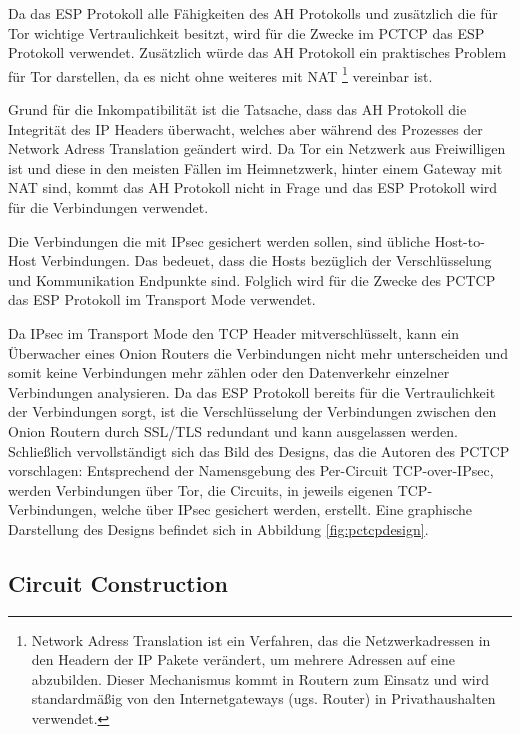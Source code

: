 \documentclass[fleqn,envcountsame,runningheads,10pt,a4paper]{llncs}
\begin{document}
Da das ESP Protokoll alle Fähigkeiten des AH Protokolls und zusätzlich die für 
Tor wichtige Vertraulichkeit besitzt, wird für die Zwecke im PCTCP das ESP 
Protokoll verwendet. Zusätzlich würde das AH Protokoll ein praktisches Problem 
für Tor darstellen, da es nicht ohne weiteres mit NAT \footnote{Network Adress 
Translation \cite{rfc:nat} ist ein Verfahren, das die Netzwerkadressen in den  
Headern der IP Pakete verändert, um mehrere Adressen auf eine abzubilden. Dieser 
Mechanismus kommt in Routern zum Einsatz und wird standardmäßig von den 
Internetgateways (ugs. Router) in Privathaushalten verwendet.}  vereinbar ist. 

Grund für die Inkompatibilität ist die Tatsache, dass das AH Protokoll die 
Integrität des IP Headers überwacht, welches aber während des Prozesses der 
Network Adress Translation geändert wird. Da Tor ein Netzwerk aus Freiwilligen 
ist und diese in den meisten Fällen im Heimnetzwerk, hinter einem Gateway mit 
NAT sind, kommt das AH Protokoll nicht in Frage und das ESP Protokoll wird für 
die Verbindungen verwendet.

Die Verbindungen die mit IPsec gesichert werden sollen, sind übliche 
Host-to-Host Verbindungen. Das bedeuet, dass die Hosts bezüglich der 
Verschlüsselung und Kommunikation Endpunkte sind. Folglich wird für die Zwecke 
des PCTCP das ESP Protokoll im Transport Mode verwendet.

Da IPsec im Transport Mode den TCP Header mitverschlüsselt, kann ein Überwacher 
eines Onion Routers die Verbindungen nicht mehr unterscheiden und somit keine 
Verbindungen mehr zählen oder den Datenverkehr einzelner Verbindungen 
analysieren. Da das ESP Protokoll bereits für die Vertraulichkeit der 
Verbindungen sorgt, ist die Verschlüsselung der Verbindungen zwischen den Onion 
Routern durch SSL/TLS redundant und kann ausgelassen werden. Schließlich 
vervollständigt sich das Bild des Designs, das die Autoren des PCTCP 
vorschlagen: Entsprechend der Namensgebung des Per-Circuit TCP-over-IPsec, 
werden Verbindungen über Tor, die Circuits, in jeweils eigenen TCP-Verbindungen, 
welche über IPsec gesichert werden, erstellt. Eine graphische Darstellung des 
Designs befindet sich in Abbildung \ref{fig:pctcpdesign}.

\subsection{Circuit Construction}
\end{document}
